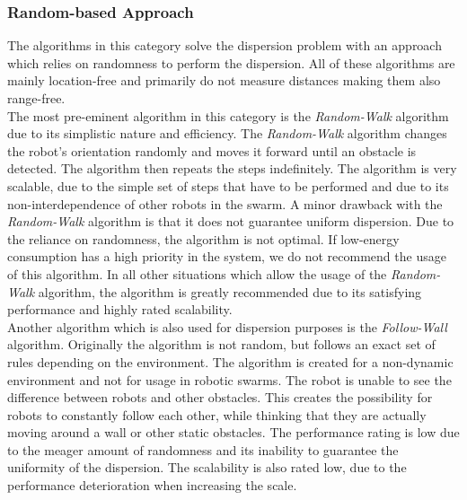 \subsubsection{Random-based Approach}
The algorithms in this category solve the dispersion problem with an approach which relies on randomness to perform the dispersion.
All of these algorithms are mainly location-free and primarily do not measure distances making them also range-free.\\
The most pre-eminent algorithm in this category is the \emph{Random-Walk} algorithm due to its simplistic nature and efficiency. \cite{morlok2007dispersing}
The \emph{Random-Walk} algorithm changes the robot's orientation randomly and moves it forward until an obstacle is detected.
The algorithm then repeats the steps indefinitely.
The algorithm is very scalable, due to the simple set of steps that have to be performed and due to its non-interdependence of other robots in the swarm.
A minor drawback with the \emph{Random-Walk} algorithm is that it does not guarantee uniform dispersion.
Due to the reliance on randomness, the algorithm is not optimal.
If low-energy consumption has a high priority in the system, we do not recommend the usage of this algorithm.
In all other situations which allow the usage of the \emph{Random-Walk} algorithm, the algorithm is greatly recommended due to its satisfying performance and highly rated scalability.\\
Another algorithm which is also used for dispersion purposes is the \emph{Follow-Wall} algorithm. \cite{morlok2007dispersing}
Originally the algorithm is not random, but follows an exact set of rules depending on the environment.
The algorithm is created for a non-dynamic environment and not for usage in robotic swarms.
The robot is unable to see the difference between robots and other obstacles. This creates the possibility for robots to constantly follow each other, while thinking that they are actually moving around a wall or other static obstacles.
The performance rating is low due to the meager amount of randomness and its inability to guarantee the uniformity of the dispersion.
The scalability is also rated low, due to the performance deterioration when increasing the scale.


